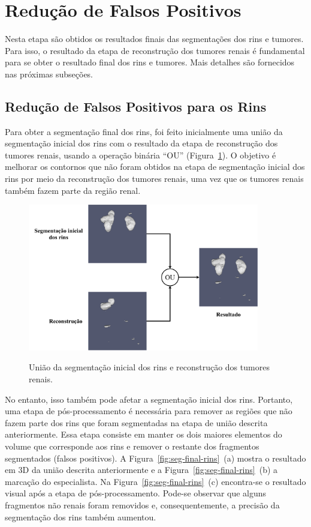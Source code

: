 \section{Redução de Falsos Positivos}
\label{sec:metodo-reducao-falsos-positivos}

Nesta etapa são obtidos os resultados finais das segmentações dos rins e tumores. Para isso, o resultado da etapa de reconstrução dos tumores renais é fundamental para se obter o resultado final dos rins e tumores. Mais detalhes são fornecidos nas próximas subseções.

\subsection{Redução de Falsos Positivos para os Rins}
\label{sec:metodo-reducao-falsos-positivos-rins}

Para obter a segmentação final dos rins, foi feito inicialmente uma união da segmentação inicial dos rins com o resultado da etapa de reconstrução dos tumores renais, usando a operação binária “OU” (Figura~\ref{fig:uniao-rins-recons}). O objetivo é melhorar os contornos que não foram obtidos na etapa de segmentação inicial dos rins por meio da reconstrução dos tumores renais, uma vez que os tumores renais também fazem parte da região renal.

\begin{figure}[!ht]
    \centering
    \caption{União da segmentação inicial dos rins e reconstrução dos tumores renais.}
    \includegraphics[width=0.9\textwidth]{figuras/uniao-rim-reconstrucao.pdf}
    \label{fig:uniao-rins-recons}
\end{figure}

No entanto, isso também pode afetar a segmentação inicial dos rins. Portanto, uma etapa de pós-processamento é necessária para remover as regiões que não fazem parte dos rins que foram segmentadas na etapa de união descrita anteriormente. Essa etapa consiste em manter os dois maiores elementos do volume que corresponde aos rins e remover o restante dos fragmentos segmentados (falsos positivos). A Figura~\ref{fig:seg-final-rins}~(a) mostra o resultado em 3D da união descrita anteriormente e a Figura~\ref{fig:seg-final-rins}~(b) a marcação do especialista. Na Figura~\ref{fig:seg-final-rins}~(c) encontra-se o resultado visual após a etapa de pós-processamento. Pode-se observar que alguns fragmentos não renais foram removidos e, consequentemente, a precisão da segmentação dos rins também aumentou.

